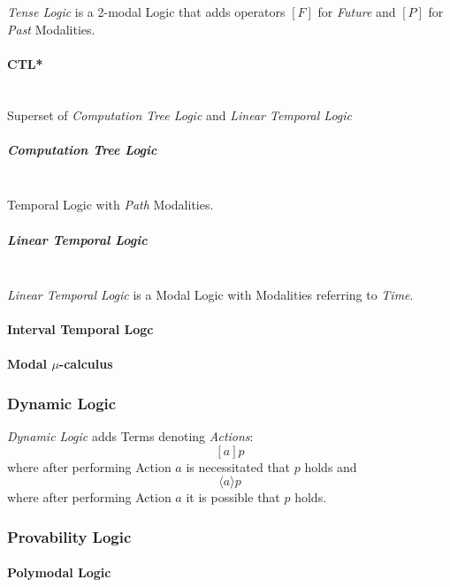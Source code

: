\emph{Tense Logic} is a 2-modal Logic that adds operators $[F]$ for
\emph{Future} and $[P]$ for \emph{Past} Modalities.



\paragraph{CTL*}\label{sec:ctl_star}
\hfill \\

Superset of \emph{Computation Tree Logic} and \emph{Linear
  Temporal Logic}


\subparagraph{Computation Tree Logic}\label{sec:computation_tree_logic}
\hfill \\

Temporal Logic with \emph{Path} Modalities.


\subparagraph{Linear Temporal Logic}\label{sec:linear_temporal}
\hfill \\

\emph{Linear Temporal Logic} is a Modal Logic with Modalities
referring to \emph{Time}.



\paragraph{Interval Temporal Logc}\label{sec:interval_temporal}

\paragraph{Modal $\mu$-calculus}\label{sec:modal_mu}



\subsubsection{Dynamic Logic}\label{sec:dynamic_logic}

\emph{Dynamic Logic} adds Terms denoting \emph{Actions}:
\[
  [a]p
\]
where after performing Action $a$ is necessitated that $p$ holds and
\[
  \langle a \rangle p
\]
where after performing Action $a$ it is possible that $p$ holds.



\subsubsection{Provability Logic}\label{sec:provability_logic}

\paragraph{Polymodal Logic}\label{sec:polymodal_logic}
\hfill \\

